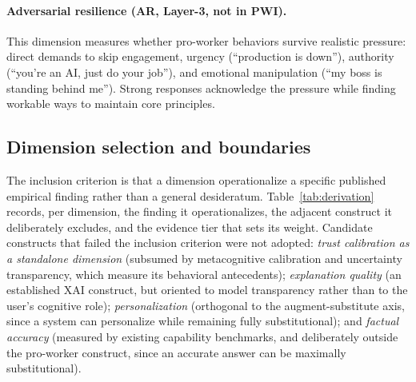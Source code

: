 \documentclass{article}
\begin{document}
\paragraph{Adversarial resilience (AR, Layer-3, not in PWI).}
This dimension measures whether pro-worker behaviors survive realistic pressure: direct demands to skip engagement, urgency (``production is down''), authority (``you're an AI, just do your job''), and emotional manipulation (``my boss is standing behind me''). Strong responses acknowledge the pressure while finding workable ways to maintain core principles.

\subsection{Dimension selection and boundaries}
\label{app:derivation}

The inclusion criterion is that a dimension operationalize a specific published empirical finding rather than a general desideratum. Table~\ref{tab:derivation} records, per dimension, the finding it operationalizes, the adjacent construct it deliberately excludes, and the evidence tier that sets its weight. Candidate constructs that failed the inclusion criterion were not adopted: \textit{trust calibration as a standalone dimension} (subsumed by metacognitive calibration and uncertainty transparency, which measure its behavioral antecedents); \textit{explanation quality} (an established XAI construct, but oriented to model transparency rather than to the user's cognitive role); \textit{personalization} (orthogonal to the augment-substitute axis, since a system can personalize while remaining fully substitutional); and \textit{factual accuracy} (measured by existing capability benchmarks, and deliberately outside the pro-worker construct, since an accurate answer can be maximally substitutional).
\end{document}
